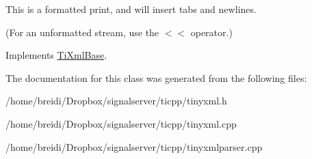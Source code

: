 This is a formatted print, and will insert tabs and newlines.

(For an unformatted stream, use the $<$$<$ operator.) 

Implements \hyperlink{class_ti_xml_base_a0de56b3f2ef14c65091a3b916437b512}{TiXmlBase}.

The documentation for this class was generated from the following files:\begin{DoxyCompactItemize}
\item 
/home/breidi/Dropbox/signalserver/ticpp/tinyxml.h\item 
/home/breidi/Dropbox/signalserver/ticpp/tinyxml.cpp\item 
/home/breidi/Dropbox/signalserver/ticpp/tinyxmlparser.cpp\end{DoxyCompactItemize}
